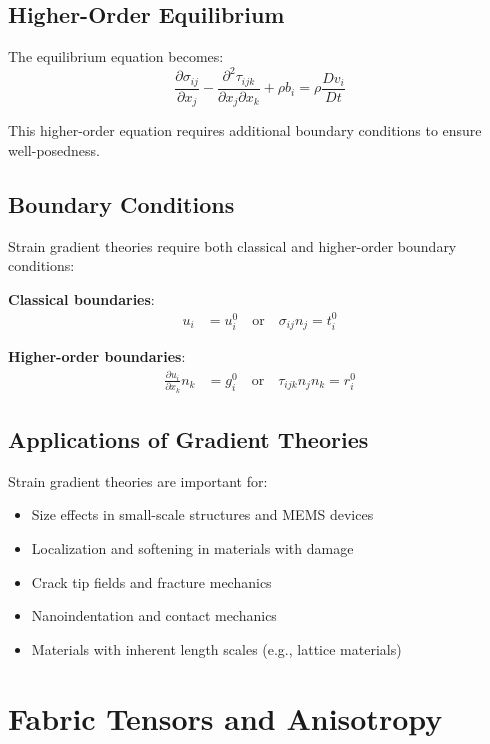 \subsection{Higher-Order Equilibrium}

The equilibrium equation becomes:
\begin{equation}
\frac{\partial \sigma_{ij}}{\partial x_j} - \frac{\partial^2 \tau_{ijk}}{\partial x_j \partial x_k} + \rho b_i = \rho \frac{D v_i}{Dt}
\end{equation}

This higher-order equation requires additional boundary conditions to ensure well-posedness.

\subsection{Boundary Conditions}

Strain gradient theories require both classical and higher-order boundary conditions:

\textbf{Classical boundaries}:
\begin{align}
u_i &= u_i^0 \quad \text{or} \quad \sigma_{ij} n_j = t_i^0
\end{align}

\textbf{Higher-order boundaries}:
\begin{align}
\frac{\partial u_i}{\partial x_k} n_k &= g_i^0 \quad \text{or} \quad \tau_{ijk} n_j n_k = r_i^0
\end{align}

\subsection{Applications of Gradient Theories}

Strain gradient theories are important for:
\begin{itemize}
\item Size effects in small-scale structures and MEMS devices
\item Localization and softening in materials with damage
\item Crack tip fields and fracture mechanics
\item Nanoindentation and contact mechanics
\item Materials with inherent length scales (e.g., lattice materials)
\end{itemize}

\section{Fabric Tensors and Anisotropy}

